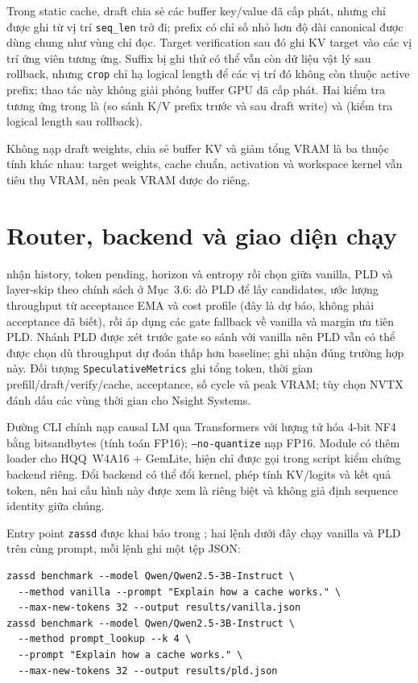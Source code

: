Trong static cache, draft chia sẻ các buffer key/value đã cấp phát, nhưng chỉ được ghi từ vị trí \texttt{seq\_len} trở đi; prefix có chỉ số nhỏ hơn độ dài canonical được dùng chung như vùng chỉ đọc. Target verification sau đó ghi KV target vào các vị trí ứng viên tương ứng. Suffix bị ghi thử có thể vẫn còn dữ liệu vật lý sau rollback, nhưng \texttt{crop} chỉ hạ logical length để các vị trí đó không còn thuộc active prefix; thao tác này không giải phóng buffer GPU đã cấp phát. Hai kiểm tra tương ứng trong  là  (so sánh K/V prefix trước và sau draft write) và  (kiểm tra logical length sau rollback).

Không nạp draft weights, chia sẻ buffer KV và giảm tổng VRAM là ba thuộc tính khác nhau: target weights, cache chuẩn, activation và workspace kernel vẫn tiêu thụ VRAM, nên peak VRAM được đo riêng.


\section{Router, backend và giao diện chạy}

 nhận history, token pending, horizon và entropy rồi chọn giữa vanilla, PLD và layer-skip theo chính sách ở Mục~3.6: dò PLD để lấy candidates, ước lượng throughput từ acceptance EMA và cost profile (đây là dự báo, không phải acceptance đã biết), rồi áp dụng các gate fallback về vanilla và margin ưu tiên PLD. Nhánh PLD được xét trước gate so sánh với vanilla nên PLD vẫn có thể được chọn dù throughput dự đoán thấp hơn baseline;  ghi nhận đúng trường hợp này. Đối tượng \texttt{SpeculativeMetrics} ghi tổng token, thời gian prefill/draft/verify/cache, acceptance, số cycle và peak VRAM; tùy chọn NVTX đánh dấu các vùng thời gian cho Nsight Systems.

Đường CLI chính nạp causal LM qua Transformers với lượng tử hóa 4-bit NF4 bằng bitsandbytes (tính toán FP16); \texttt{--no-quantize} nạp FP16. Module  có thêm loader cho HQQ~W4A16 + GemLite, hiện chỉ được gọi trong script kiểm chứng backend riêng. Đổi backend có thể đổi kernel, phép tính KV/logits và kết quả token, nên hai cấu hình này được xem là riêng biệt và không giả định sequence identity giữa chúng.

Entry point \texttt{zassd} được khai báo trong ; hai lệnh dưới đây chạy vanilla và PLD trên cùng prompt, mỗi lệnh ghi một tệp JSON:

\begin{verbatim}
zassd benchmark --model Qwen/Qwen2.5-3B-Instruct \
  --method vanilla --prompt "Explain how a cache works." \
  --max-new-tokens 32 --output results/vanilla.json
zassd benchmark --model Qwen/Qwen2.5-3B-Instruct \
  --method prompt_lookup --k 4 \
  --prompt "Explain how a cache works." \
  --max-new-tokens 32 --output results/pld.json
\end{verbatim}

